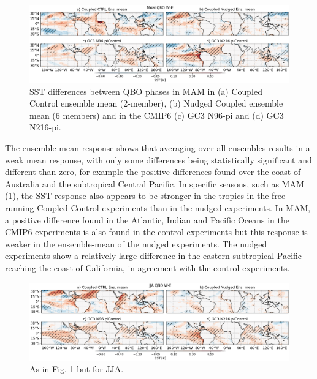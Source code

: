 \begin{figure}[t!]
\centering
 \includegraphics[width=\linewidth]{figures/sstseasonal_mamqbowqboe.png}
\caption[SST response in MAM to the QBO in coupled nudged experiments]{ SST differences between QBO phases in MAM in (a) Coupled Control ensemble mean (2-member), (b) Nudged Coupled ensemble mean (6 members) and in the CMIP6 (c) GC3 N96-pi and (d) GC3 N216-pi.}
\label{fig:sst_mam_coupled}
\end{figure}

The ensemble-mean response shows that averaging over all ensembles results in a weak mean response, with only some differences being statistically significant and different than zero, for example the positive differences found over the coast of Australia and the subtropical Central Pacific. 
In specific seasons, such as MAM (\ref{fig:sst_mam_coupled}), the SST response also appears to be stronger in the tropics in the free-running Coupled Control experiments than in the nudged experiments. 
In MAM, a positive difference found in the Atlantic, Indian and Pacific Oceans in the CMIP6 experiments is also found in the control experiments but this response is weaker in the ensemble-mean of the nudged experiments.
The nudged experiments show a relatively large difference in the eastern subtropical Pacific reaching the coast of California, in agreement with the control experiments.

\begin{figure}[t!]
\centering
 \includegraphics[width=\linewidth]{figures/sstseasonal_jjaqbowqboe.png}
\caption[SST response in JJA to the QBO in coupled nudged experiments]{As in Fig. \ref{fig:sst_mam_coupled} but for JJA.}
\label{fig:sst_jja_coupled}
\end{figure}

